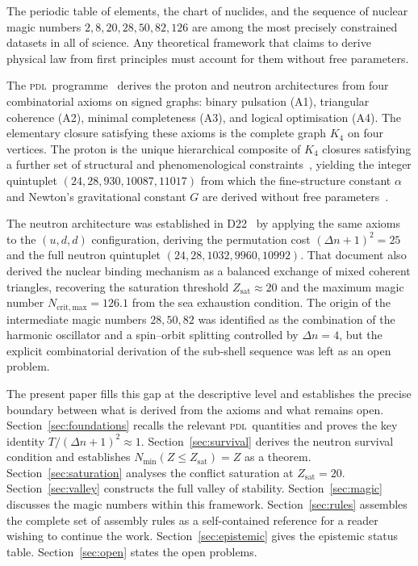 \documentclass{article}
\theoremstyle{remark}
\newcommand{\PDL}{\textsc{pdl}}
\newcommand{\Kfour}{K_4}
\newcommand{\Zsat}{Z_{\mathrm{sat}}}
\newcommand{\Nmin}{N_{\min}}
\newcommand{\Deltanop}{\Delta n}
\begin{document}
The periodic table of elements, the chart of nuclides, and the sequence of nuclear magic numbers $2, 8, 20, 28, 50, 82, 126$ are among the most precisely constrained datasets in all of science. Any theoretical framework that claims to derive physical law from first principles must account for them without free parameters.

The \PDL\ programme~\cite{D01,D22,D23,D29} derives the proton and neutron architectures from four combinatorial axioms on signed graphs: binary pulsation (A1), triangular coherence (A2), minimal completeness (A3), and logical optimisation (A4). The elementary closure satisfying these axioms is the complete graph $\Kfour$ on four vertices. The proton is the unique hierarchical composite of $\Kfour$ closures satisfying a further set of structural and phenomenological constraints~\cite{D16,D25}, yielding the integer quintuplet $(24, 28, 930, 10087, 11017)$ from which the fine-structure constant $\alpha$ and Newton's gravitational constant $G$ are derived without free parameters~\cite{D12,D21,D25}.

The neutron architecture was established in D22~\cite{D22} by applying the same axioms to the $(u,d,d)$ configuration, deriving the permutation cost $(\Deltanop+1)^2 = 25$ and the full neutron quintuplet $(24, 28, 1032, 9960, 10992)$. That document also derived the nuclear binding mechanism as a balanced exchange of mixed coherent triangles, recovering the saturation threshold $\Zsat \approx 20$ and the maximum magic number $N_{\mathrm{crit,max}} = 126.1$ from the sea exhaustion condition. The origin of the intermediate magic numbers $28, 50, 82$ was identified as the combination of the harmonic oscillator and a spin--orbit splitting controlled by $\Deltanop = 4$, but the explicit combinatorial derivation of the sub-shell sequence was left as an open problem.

The present paper fills this gap at the descriptive level and establishes the precise boundary between what is derived from the axioms and what remains open. Section~\ref{sec:foundations} recalls the relevant \PDL\ quantities and proves the key identity $T/(\Deltanop+1)^2 \approx 1$. Section~\ref{sec:survival} derives the neutron survival condition and establishes $\Nmin(Z \leq \Zsat) = Z$ as a theorem. Section~\ref{sec:saturation} analyses the conflict saturation at $\Zsat = 20$. Section~\ref{sec:valley} constructs the full valley of stability. Section~\ref{sec:magic} discusses the magic numbers within this framework. Section~\ref{sec:rules} assembles the complete set of assembly rules as a self-contained reference for a reader wishing to continue the work. Section~\ref{sec:epistemic} gives the epistemic status table. Section~\ref{sec:open} states the open problems.
\end{document}
